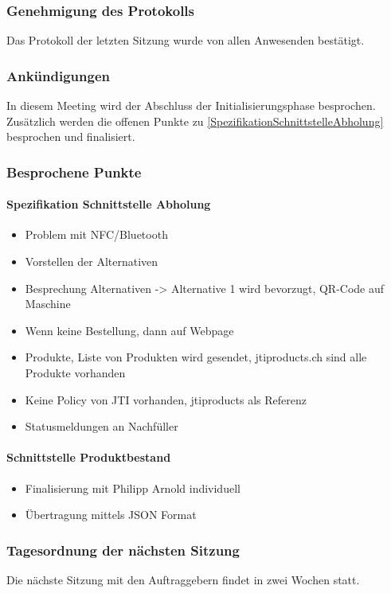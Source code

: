 \subsubsection{Genehmigung des Protokolls}
Das Protokoll der letzten Sitzung wurde von allen Anwesenden bestätigt.
\subsubsection{Ankündigungen}
In diesem Meeting wird der Abschluss der Initialisierungsphase besprochen. Zusätzlich werden die offenen Punkte zu \ref{SpezifikationSchnittstelleAbholung} besprochen und finalisiert. 
\subsubsection{Besprochene Punkte}
\paragraph{Spezifikation Schnittstelle Abholung}
	\begin{itemize}
		\item Problem mit NFC/Bluetooth
		\item Vorstellen der Alternativen
		\item Besprechung Alternativen -> Alternative 1 wird bevorzugt, QR-Code auf Maschine 
		\item Wenn keine Bestellung, dann auf Webpage
		\item Produkte, Liste von Produkten wird gesendet, jtiproducts.ch sind alle Produkte vorhanden
		\item Keine Policy von JTI vorhanden, jtiproducts als Referenz
		\item Statusmeldungen an Nachfüller
	\end{itemize}
\paragraph{Schnittstelle Produktbestand}
	\begin{itemize}
		\item Finalisierung mit Philipp Arnold individuell
		\item Übertragung mittels JSON Format
	\end{itemize}
\subsubsection{Tagesordnung der nächsten Sitzung}
Die nächste Sitzung mit den Auftraggebern findet in zwei Wochen statt. 
\newpage
